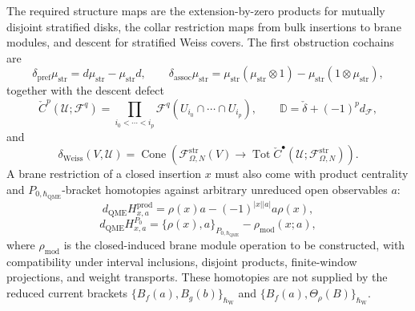 \begin{enumerate}
  The required structure maps are the extension-by-zero products for
  mutually disjoint stratified disks, the collar restriction maps from
  bulk insertions to brane modules, and descent for stratified Weiss
  covers.  The first obstruction cochains are
  \[
    \delta_{\mathrm{pref}}\mu_{\mathrm{str}}
      =
      d\mu_{\mathrm{str}}
      -\mu_{\mathrm{str}}d,\qquad
    \delta_{\mathrm{assoc}}\mu_{\mathrm{str}}
      =
      \mu_{\mathrm{str}}(\mu_{\mathrm{str}}\otimes1)
      -\mu_{\mathrm{str}}(1\otimes\mu_{\mathrm{str}}),
  \]
  together with the descent defect
  \[
    \check C^p(\mathcal U;\mathcal F^q)
    =
    \prod_{i_0<\cdots<i_p}
    \mathcal F^q(U_{i_0}\cap\cdots\cap U_{i_p}),
    \qquad
    \mathbb D=\check\delta+(-1)^p d_{\mathcal F},
  \]
  and
  \[
    \delta_{\mathrm{Weiss}}(V,\mathcal U)
    =
    \operatorname{Cone}\left(
      \mathcal F^{\mathrm{str}}_{\Omega,N}(V)
      \to
      \operatorname{Tot}\check C^\bullet
      (\mathcal U;\mathcal F^{\mathrm{str}}_{\Omega,N})
    \right).
  \]
  A brane restriction of a closed insertion \(x\) must also come with
  product centrality and \(P_{0,\hbar_{\mathrm{QME}}}\)-bracket homotopies against
  arbitrary unreduced open observables \(a\):
  \[
    d_{\mathrm{QME}}H^{\mathrm{prod}}_{x,a}
      =
      \rho(x)a-(-1)^{|x||a|}a\rho(x),
  \]
  \[
    d_{\mathrm{QME}}H^{P_0}_{x,a}
      =
      \{\rho(x),a\}_{P_{0,\hbar_{\mathrm{QME}}}}
      -\rho_{\mathrm{mod}}(x;a),
  \]
  where \(\rho_{\mathrm{mod}}\) is the closed-induced brane module
  operation to be constructed, with compatibility under interval
  inclusions, disjoint products,
  finite-window projections, and weight transports.  These homotopies are
  not supplied by the reduced current brackets
  \(\{B_f(a),B_g(b)\}_{\hbar_{\mathrm{W}}}\) and
  \(\{B_f(a),\Theta_\rho(B)\}_{\hbar_{\mathrm{W}}}\).


\end{enumerate}
